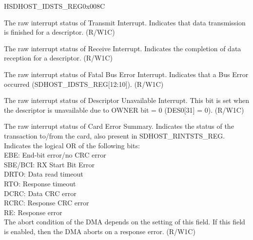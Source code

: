 \begin{register}{H}{SDHOST\_IDSTS\_REG}{0x008C}\label{regdesc:SDHOSTIDSTSREG}
%
%
%
%
%
%
%
%
%
%
%
%
\regnewline%
\begin{regdesc}\begin{reglist}
\label{fielddesc:SDHOSTIDSTSTI}\item [SDHOST\_IDSTS\_TI] The raw interrupt status of Transmit Interrupt. Indicates that data transmission is finished for a descriptor. (R/W1C)
\label{fielddesc:SDHOSTIDSTSRI}\item [SDHOST\_IDSTS\_RI] The raw interrupt status of Receive Interrupt. Indicates the completion of data reception for a descriptor. (R/W1C)
\label{fielddesc:SDHOSTIDSTSFBE}\item [SDHOST\_IDSTS\_FBE] The raw interrupt status of Fatal Bus Error Interrupt. Indicates that a Bus Error occurred (SDHOST\_IDSTS\_REG[12:10]). (R/W1C)
\label{fielddesc:SDHOSTIDSTSDU}\item [SDHOST\_IDSTS\_DU] The raw interrupt status of Descriptor Unavailable Interrupt. This bit is set when the descriptor is unavailable due to OWNER bit = 0 (DES0[31] = 0). (R/W1C)
\label{fielddesc:SDHOSTIDSTSCES}\item [SDHOST\_IDSTS\_CES] The raw interrupt status of Card Error Summary. Indicates the status of the transaction to/from the card, also present in SDHOST\_RINTSTS\_REG. Indicates the logical OR of the following bits:\\
EBE: End-bit error/no CRC error\\
SBE/BCI: RX Start Bit Error\\
DRTO: Data read timeout\\
RTO: Response timeout\\
DCRC: Data CRC error\\
RCRC: Response CRC error\\
RE: Response error\\
The abort condition of the DMA depends on the setting of this field. If this field is enabled, then the DMA aborts on a response error. (R/W1C)

\end{reglist}
\end{regdesc}
\end{register}
